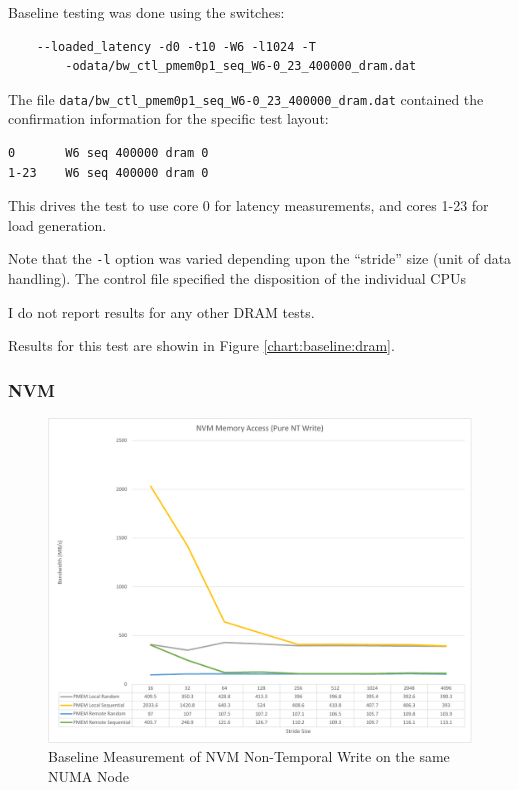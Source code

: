 Baseline testing was done using the switches:

\begin{verbatim}
    --loaded_latency -d0 -t10 -W6 -l1024 -T 
        -odata/bw_ctl_pmem0p1_seq_W6-0_23_400000_dram.dat
\end{verbatim}

The file \verb+data/bw_ctl_pmem0p1_seq_W6-0_23_400000_dram.dat+ contained the confirmation information
for the specific test layout:

\begin{verbatim}
0       W6 seq 400000 dram 0
1-23    W6 seq 400000 dram 0
\end{verbatim}

This drives the test to use core 0 for latency measurements, and cores 1-23 for load generation.

Note that the \verb+-l+ option was varied depending upon the ``stride'' size (unit of data handling).
The control file specified the disposition of the individual CPUs

I do not report results for any other DRAM tests.

Results for this test are showin in Figure \ref{chart:baseline:dram}.

\subsubsection{NVM}\label{baseline:nvm}

\begin{figure}[b]
\centering
    \caption{Baseline Measurement of NVM Non-Temporal Write on the same NUMA Node}\label{chart:baseline:nvm}
    \includegraphics[width=1\textwidth]{charts/nt-write-both-nodes-crop.pdf}
\end{figure}

